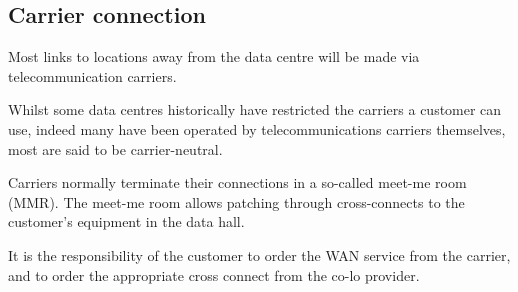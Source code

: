 \documentclass{pgnotes}
\begin{document}
\subsection{Carrier connection}

Most links to locations away from the data centre will be made via telecommunication carriers.

Whilst some data centres historically have restricted the carriers a customer can use, indeed many have been operated by telecommunications carriers themselves, most are said to be carrier-neutral.

Carriers normally terminate their connections in a so-called meet-me room (MMR).
The meet-me room allows patching through cross-connects to the customer's equipment in the data hall. 

It is the responsibility of the customer to order the WAN service from the carrier, and to order the appropriate cross connect from the co-lo provider.
\end{document}
